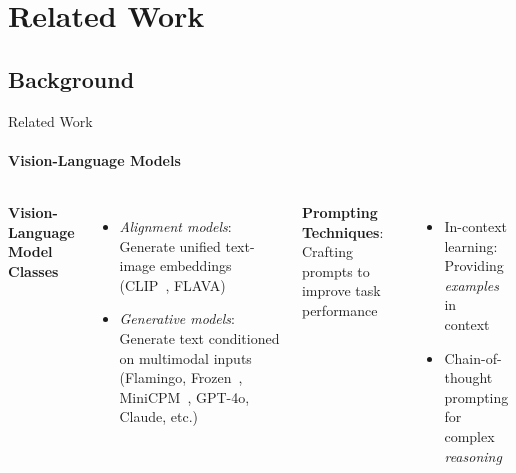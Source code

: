 \section{Related Work}
\subsection{Background}
\begin{frame}{Related Work}
\framesubtitle{Vision-Language Models}
  \vspace{-1em}
  \begin{columns}[T]
    \column{\customcolumnwidth}
    \textbf{Vision-Language Model Classes}
    \vspace{-0.4em}
    \begin{itemize}
      \item \emph{Alignment models}: Generate unified text-image embeddings (CLIP~, FLAVA) \vspace{-0.2em}
      \item \emph{Generative models}: Generate text conditioned on multimodal inputs (Flamingo, Frozen~, MiniCPM~, GPT-4o, Claude, etc.)
    \end{itemize}
    \column{\customcolumnwidth}
    \textbf{Prompting Techniques}: Crafting prompts to improve task performance~
    \begin{itemize}
      \item In-context learning: Providing \emph{examples} in context~
      \item Chain-of-thought prompting for complex \emph{reasoning}~
    \end{itemize}
  \end{columns}
\end{frame}
